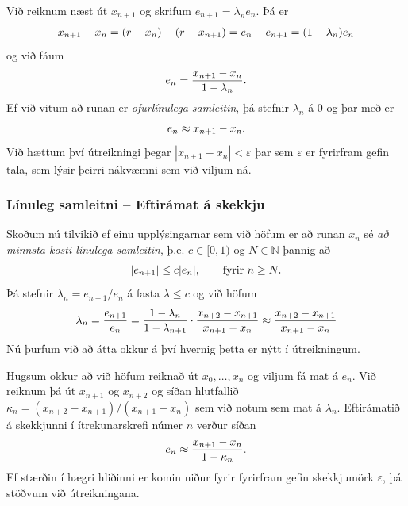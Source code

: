 \documentclass[a4paper,10pt,icelandic]{sphinxmanual}
\begin{document}
Við reiknum næst út \(x_{n+1}\) og skrifum
\(e_{n+1}=\lambda_ne_n\). Þá er
\begin{gather}
\begin{split}x_{n+1}-x_n = (r-x_n)-(r-x_{n+1})
    = e_n-e_{n+1} = (1-\lambda_n)e_n\end{split}\notag
\end{gather}
og við fáum
\begin{gather}
\begin{split}e_n = \dfrac{x_{n+1}-x_n}{1-\lambda_n}.\end{split}\notag
\end{gather}
Ef við vitum að runan er \emph{ofurlínulega samleitin}, þá stefnir
\(\lambda_n\) á \(0\) og þar með er
\begin{gather}
\begin{split}e_n\approx x_{n+1}-x_n.\end{split}\notag
\end{gather}
Við hættum því útreikningi þegar \(|x_{n+1}-x_n|<\varepsilon\) þar
sem \(\varepsilon\) er fyrirfram gefin tala, sem lýsir þeirri
nákvæmni sem við viljum ná.


\subsubsection{Línuleg samleitni -- Eftirámat á skekkju}
\label{kafli01:index-9}\label{kafli01:linuleg-samleitni-eftiramat-a-skekkju}
Skoðum nú tilvikið ef einu upplýsingarnar sem við höfum er
að runan \(x_n\) sé \emph{að minnsta kosti
línulega samleitin}, þ.e. \(c\in [0,1)\) og \(N\in \mathbb N\)
þannig að
\begin{gather}
\begin{split}|e_{n+1}|\leq c|e_n|, \qquad \text{fyrir } n \geq N.\end{split}\notag
\end{gather}
Þá stefnir \(\lambda_n = e_{n+1}/e_n\) á fasta \(\lambda \leq c\) og við höfum
\begin{gather}
\begin{split}\lambda_n = \dfrac{e_{n+1}}{e_n} =
    \dfrac{1-\lambda_n}{1-\lambda_{n+1}}
    \cdot\dfrac{x_{n+2}-x_{n+1}}{x_{n+1}-x_n}\approx
    \dfrac{x_{n+2}-x_{n+1}}{x_{n+1}-x_n}\end{split}\notag
\end{gather}
Nú þurfum við að átta okkur á því hvernig þetta er nýtt í útreikningum.

Hugsum okkur að við höfum reiknað út \(x_0,\dots,x_n\) og viljum fá
mat á \(e_n\). Við reiknum þá út \(x_{n+1}\) og \(x_{n+2}\)
og síðan hlutfallið \(\kappa_n=(x_{n+2} - x_{n+1})/(x_{n+1} -
x_n)\) sem við notum sem mat á \(\lambda_n\). Eftirámatið á
skekkjunni í ítrekunarskrefi númer \(n\) verður síðan
\begin{gather}
\begin{split}e_n\approx \dfrac{x_{n+1}-x_n}{1-\kappa_n}.\end{split}\notag
\end{gather}
Ef stærðin í hægri hliðinni er komin niður fyrir fyrirfram gefin
skekkjumörk \(\varepsilon\), þá stöðvum við útreikningana.
\end{document}
